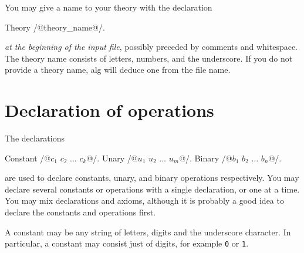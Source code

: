 \documentclass{report}
\begin{document}
You may give a name to your theory with the declaration
%
\begin{alg}
Theory /@theory_name@/.
\end{alg}
%
\emph{at the beginning of the input file}, possibly preceded by
comments and whitespace. The theory name consists of letters, numbers,
and the underscore. If you do not provide a theory name, alg will
deduce one from the file name.

\section{Declaration of operations}

The declarations
%
\begin{alg}
Constant /@$c_1$ $c_2$ $\ldots$ $c_k$@/.
Unary /@$u_1$ $u_2$ $\ldots$ $u_m$@/.
Binary /@$b_1$ $b_2$ $\ldots$ $b_n$@/.
\end{alg}
%
are used to declare constants, unary, and binary operations
respectively. You may declare several constants or operations with a
single declaration, or one at a time. You may mix declarations and
axioms, although it is probably a good idea to declare the constants
and operations first.

A constant may be any string of letters, digits and the underscore
character. In particular, a constant may consist just of digits, for
example \texttt{0} or \texttt{1}.
\end{document}
